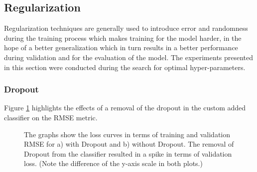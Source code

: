 \subsection{Regularization}
Regularization techniques are generally used to introduce error and randomness during the training process which makes training for the model harder, in the hope of a better generalization which in turn results in a better performance during validation and for the evaluation of the model. The experiments presented in this section were conducted during the search for optimal hyper-parameters.

\subsubsection{Dropout}
Figure \ref{fig:AblationNoDropout} highlights the effects of a removal of the dropout in the custom added classifier on the RMSE metric.\newline

\begin{figure}[htbp]
  \centering
  \hfill
  \caption[Ablation Study: Dropout loss curve]{The graphs show the loss curves in terms of training and validation RMSE for a) with Dropout and b) without Dropout. The removal of Dropout from the classifier resulted in a spike in terms of validation loss. (Note the difference of the y-axis scale in both plots.)}
  \label{fig:AblationNoDropout}
\end{figure}

